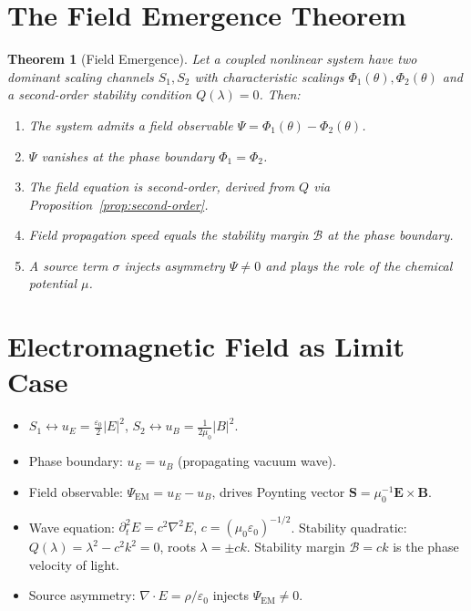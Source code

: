 \documentclass[11pt,twoside]{article}
\theoremstyle{plain}
\newtheorem{theorem}{Theorem}[section]
\theoremstyle{definition}
\theoremstyle{remark}
\begin{document}
\section{The Field Emergence Theorem}

\begin{theorem}[Field Emergence]\label{thm:field}
Let a coupled nonlinear system have two dominant scaling channels $S_1, S_2$
with characteristic scalings $\Phi_1(\theta), \Phi_2(\theta)$ and a second-order
stability condition $Q(\lambda)=0$.  Then:
\begin{enumerate}
\item The system admits a field observable $\varPsi=\Phi_1(\theta)-\Phi_2(\theta)$.
\item $\varPsi$ vanishes at the phase boundary $\Phi_1=\Phi_2$.
\item The field equation is second-order, derived from $Q$ via
      Proposition~\ref{prop:second-order}.
\item Field propagation speed equals the stability margin $\mathcal{B}$ at the
      phase boundary.
\item A source term $\sigma$ injects asymmetry $\varPsi\ne 0$ and plays the
      role of the chemical potential $\mu$.
\end{enumerate}
\end{theorem}

\section{Electromagnetic Field as Limit Case}

\begin{itemize}
\item $S_1 \leftrightarrow u_E = \tfrac{\varepsilon_0}{2}|E|^2$,
      $S_2 \leftrightarrow u_B = \tfrac{1}{2\mu_0}|B|^2$.
\item Phase boundary: $u_E = u_B$ (propagating vacuum wave).
\item Field observable: $\varPsi_{\mathrm{EM}} = u_E - u_B$, drives Poynting
      vector $\mathbf{S} = \mu_0^{-1}\mathbf{E}\times\mathbf{B}$.
\item Wave equation: $\partial_t^2 E = c^2\nabla^2 E$, $c=({\mu_0\varepsilon_0})^{-1/2}$.
      Stability quadratic: $Q(\lambda)=\lambda^2-c^2k^2=0$, roots $\lambda=\pm ck$.
      Stability margin $\mathcal{B}=ck$ is the phase velocity of light.
\item Source asymmetry: $\nabla\cdot E = \rho/\varepsilon_0$ injects $\varPsi_{\mathrm{EM}}\ne 0$.
\end{itemize}
\end{document}
